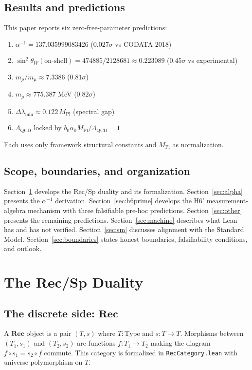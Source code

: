 \documentclass[11pt,twoside]{article}
\newcommand{\rec}{\mathbf{Rec}}
\begin{document}
\subsection{Results and predictions}
This paper reports six zero-free-parameter predictions:
\begin{enumerate}
\item $\alpha^{-1} = 137.035999083426$ ($0.027\sigma$ vs CODATA 2018)
\item $\sin^2\theta_W(\text{on-shell}) = 474885/2128681 \approx 0.223089$ ($0.45\sigma$ vs experimental)
\item $m_\rho/m_\mu \approx 7.3386$ ($0.81\sigma$)
\item $m_\rho \approx 775.387$ MeV ($0.82\sigma$)
\item $\Delta\lambda_{\min} \approx 0.122\,M_{\mathrm{Pl}}$ (spectral gap)
\item $\Lambda_{\mathrm{QCD}}$ locked by $b_0\alpha_0 M_{\mathrm{Pl}}/\Lambda_{\mathrm{QCD}} = 1$
\end{enumerate}
Each uses only framework structural constants and $M_{\mathrm{Pl}}$ as normalization.

\subsection{Scope, boundaries, and organization}
Section~\ref{sec:recsp} develops the Rec/Sp duality and its formalization. Section~\ref{sec:alpha} presents the $\alpha^{-1}$ derivation. Section~\ref{sec:h6prime} develops the H6' measurement-algebra mechanism with three falsifiable pre-hoc predictions. Section~\ref{sec:other} presents the remaining predictions. Section~\ref{sec:machine} describes what Lean has and has not verified. Section~\ref{sec:sm} discusses alignment with the Standard Model. Section~\ref{sec:boundaries} states honest boundaries, falsifiability conditions, and outlook.

\section{The Rec/Sp Duality}
\label{sec:recsp}

\subsection{The discrete side: $\rec$}
A $\rec$ object is a pair $(T, s)$ where $T : \mathrm{Type}$ and $s : T \to T$. Morphisms between $(T_1, s_1)$ and $(T_2, s_2)$ are functions $f : T_1 \to T_2$ making the diagram $f \circ s_1 = s_2 \circ f$ commute. This category is formalized in \texttt{RecCategory.lean} with universe polymorphism on $T$.
\end{document}
